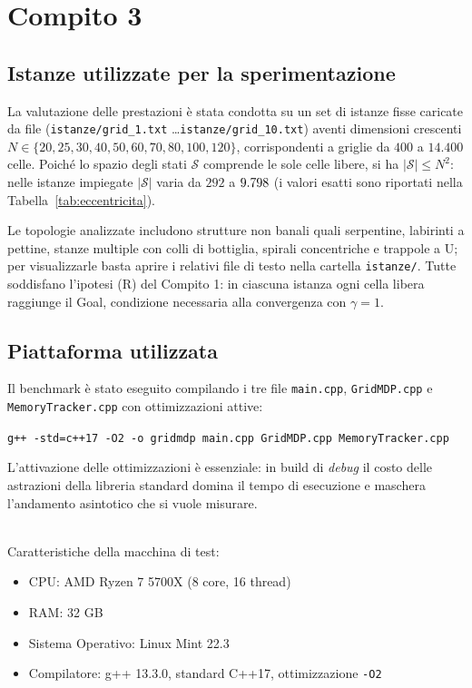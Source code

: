 \section{Compito 3}

\subsection{Istanze utilizzate per la sperimentazione}
La valutazione delle prestazioni è stata condotta su un set di \benchNistanze{} istanze fisse caricate da file (\texttt{istanze/grid\_1.txt} \dots \texttt{istanze/grid\_10.txt}) aventi dimensioni crescenti \\ $N \in \{20, 25, 30, 40, 50, 60, 70, 80, 100, 120\}$, corrispondenti a griglie da $400$ a $14.400$ celle. Poiché lo spazio degli stati $\mathcal{S}$ comprende le sole celle libere, si ha $|\mathcal{S}| \le N^2$: nelle istanze impiegate $|\mathcal{S}|$ varia da $292$ a $9.798{}$ (i valori esatti sono riportati nella Tabella~\ref{tab:eccentricita}).

\noindent
Le topologie analizzate includono strutture non banali quali serpentine, labirinti a pettine, stanze multiple con colli di bottiglia, spirali concentriche e trappole a U; per visualizzarle basta aprire i relativi file di testo nella cartella \texttt{istanze/}. Tutte soddisfano l'ipotesi (R) del Compito 1: in ciascuna istanza ogni cella libera raggiunge il Goal, condizione necessaria alla convergenza con $\gamma = 1$.

\subsection{Piattaforma utilizzata}
Il benchmark è stato eseguito compilando i tre file \texttt{main.cpp}, \texttt{GridMDP.cpp} e \texttt{MemoryTracker.cpp} con ottimizzazioni attive:
\begin{center}
\texttt{g++ -std=c++17 -O2 -o gridmdp main.cpp GridMDP.cpp MemoryTracker.cpp}
\end{center}
\noindent
L'attivazione delle ottimizzazioni è essenziale: in build di \textit{debug} il costo delle astrazioni della libreria standard domina il tempo di esecuzione e maschera l'andamento asintotico che si vuole misurare.

\noindent\\
Caratteristiche della macchina di test:
\begin{itemize}
    \item CPU: AMD Ryzen 7 5700X (8 core, 16 thread)
    \item RAM: 32 GB
    \item Sistema Operativo: Linux Mint 22.3
    \item Compilatore: g++ 13.3.0, standard C++17, ottimizzazione \texttt{-O2}
\end{itemize}

